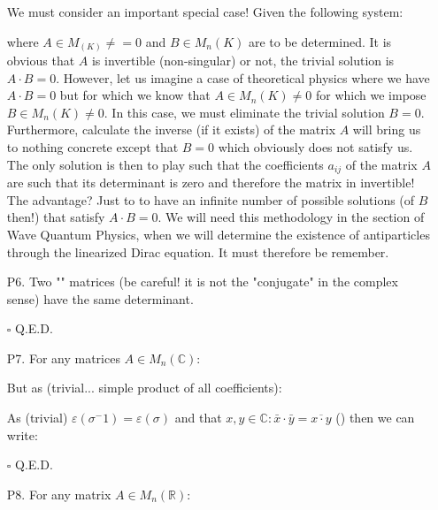 \begin{enumerate}
		We must consider an important special case! Given the following system:
		
		where $A\in M_(K)\neq =0$ and $B\in M_n(K)$ are to be determined. It is obvious that $A$ is invertible (non-singular) or not, the trivial solution is $A\cdot B=0$. However, let us imagine a case of theoretical physics where we have $A\cdot B=0$ but for which we know that $A\in M_n(K)\neq 0$ for which we impose $B\in M_n(K)\neq 0$. In this case, we must eliminate the trivial solution $B=0$. Furthermore, calculate the inverse (if it exists) of the matrix $A$ will bring us to nothing concrete except that $B=0$ which obviously does not satisfy us. The only solution is then to play such that the coefficients $a_{ij}$ of the matrix $A$ are such that its determinant is zero and therefore the matrix in invertible! The advantage? Just to to have an infinite number of possible solutions (of $B$ then!) that satisfy $A\cdot B=0$. We will need this methodology in the section of Wave Quantum Physics, when we will determine the existence of antiparticles through the linearized Dirac equation. It must therefore be remember.
		
		\item[P6.] Two "" matrices (be careful! it is not the "conjugate" in the complex sense) have the same determinant.
		\begin{dem}
		
		
		\begin{flushright}
			$\square$  Q.E.D.
		\end{flushright}
		\end{dem}
		
		\item[P7.] For any matrices $A\in M_n(\mathbb{C})$:
		\begin{dem}
		
		But as (trivial... simple product of all coefficients):
		
		As (trivial) $\varepsilon(\sigma^-1)=\varepsilon(\sigma)$ and that $x,y\in\mathbb{C}:\bar{x}\cdot \bar{y}=\overline{x\cdot y}$ () then we can write:
		
		\begin{flushright}
			$\square$  Q.E.D.
		\end{flushright}
		\end{dem}
		
		\item[P8.] For any matrix $A\in M_n(\mathbb{R})$:
		

\end{enumerate}
